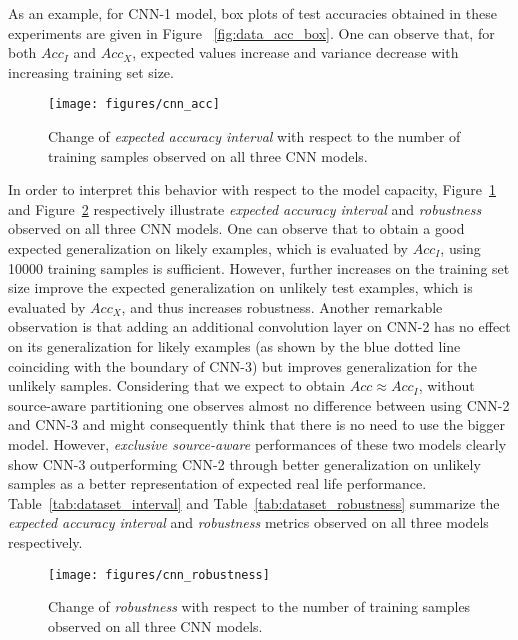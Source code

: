 \documentclass[letterpaper]{article}
\begin{document}
As an example, for CNN-1 model, box plots of test accuracies obtained in these experiments are given in Figure ~\ref{fig:data_acc_box}. One can observe that, for both $Acc_I$ and $Acc_X$, expected values increase and variance decrease with increasing training set size.
\begin{figure}[b]
	\begin{center}
		\centerline{\texttt{[image: figures/cnn\_acc]}}
		\caption{Change of \textit{expected accuracy interval} with respect to the number of training samples observed on all three CNN models.}
		\label{fig:data_acc}
	\end{center}
	\vskip -0.1in
\end{figure} 
In order to interpret this behavior with respect to the model capacity, Figure~\ref{fig:data_acc} and Figure~\ref{fig:data_robust} respectively illustrate \textit{expected accuracy interval} and \textit{robustness} observed on all three CNN models. One can observe that to obtain a good expected generalization on likely examples, which is evaluated by $Acc_I$, using 10000 training samples is sufficient. However, further increases on the training set size improve the expected generalization on unlikely test examples, which is evaluated by $Acc_X$, and thus increases robustness. Another remarkable observation is that adding an additional convolution layer on CNN-2 has no effect on its generalization for likely examples (as shown by the blue dotted line coinciding with the boundary of CNN-3) but improves generalization for the unlikely samples. Considering that we expect to obtain $Acc \approx Acc_I$, without source-aware partitioning one observes almost no difference between using CNN-2 and CNN-3 and might consequently think that there is no need to use the bigger model. However, \textit{exclusive source-aware} performances of these two models clearly show CNN-3 outperforming CNN-2 through better generalization on unlikely samples as a better representation of expected real life performance. Table~\ref{tab:dataset_interval} and Table~\ref{tab:dataset_robustness} summarize the \textit{expected accuracy interval} and \textit{robustness} metrics observed on all three models respectively.

\begin{figure}[t]
	\begin{center}
		\centerline{\texttt{[image: figures/cnn\_robustness]}}
		\caption{Change of \textit{robustness} with respect to the number of training samples observed on all three CNN models.}
		\label{fig:data_robust}
	\end{center}
	\vskip -0.3in
\end{figure}
\end{document}
